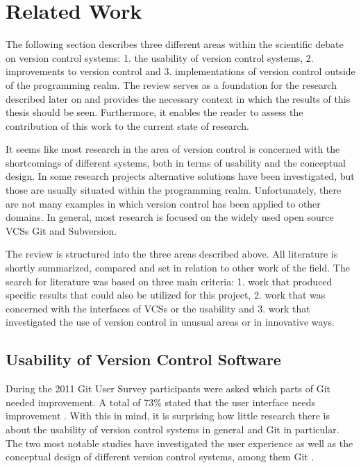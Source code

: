 \chapter{Related Work} \label{chapter:related-work}
The following section describes three different areas within the scientific debate on version control systems: 1. the usability of version control systems, 2. improvements to version control and 3.  implementations of version control outside of the programming realm. The review serves as a foundation for the research described later on and provides the necessary context in which the results of this thesis should be seen. Furthermore, it enables the reader to assess the contribution of this work to the current state of research.

It seems like most research in the area of version control is concerned with the shortcomings of different systems, both in terms of usability and the conceptual design. In some research projects alternative solutions have been investigated, but those are usually situated within the programming realm. Unfortunately, there are not many examples in which version control has been applied to other domains. In general, most research is focused on the widely used open source VCSs Git and Subversion.

The review is structured into the three areas described above. All literature is shortly summarized, compared and set in relation to other work of the field. The search for literature was based on three main criteria: 1. work that produced specific results that could also be utilized for this project, 2. work that was concerned with the interfaces of VCSs or the usability and 3. work that investigated the use of version control in unusual areas or in innovative ways. %

\section{Usability of Version Control Software}
During the 2011 Git User Survey participants were asked which parts of Git needed improvement. A total of 73\% stated that  the user interface needs improvement \cite{_git_2011}. With this in mind, it is surprising how little research there is about the usability of version control systems in general and Git in particular. The two most notable studies have investigated the user experience as well as the conceptual design of different version control systems, among them Git \cite{church_case_2014,perez_de_rosso_whats_2013}.

